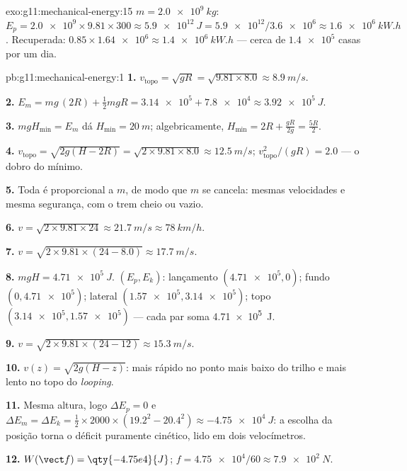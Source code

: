 \begin{solution}{exo:g11:mechanical-energy:15}
$m = \qty{2.0e9}{kg}$:
$E_p = \num{2.0e9} \times 9.81 \times 300 \approx \qty{5.9e12}{J}
= \num{5.9e12}/\num{3.6e6} \approx \qty{1.6e6}{kW.h}$. Recuperada:
$0.85 \times \num{1.64e6} \approx \qty{1.4e6}{kW.h}$ --- cerca de
$\num{1.4e5}$ casas por um dia.
\end{solution}

\begin{solution}{pb:g11:mechanical-energy:1}
\textbf{1.} $v_{\text{topo}} = \sqrt{gR} = \sqrt{9.81 \times 8.0}
\approx \qty{8.9}{m/s}$.

\textbf{2.} $E_m = mg\,(2R) + \tfrac12 m gR = \num{3.14e5} +
\num{7.8e4} \approx \qty{3.92e5}{J}$.

\textbf{3.} $mgH_{\min} = E_m$ dá $H_{\min} = \qty{20}{m}$;
algebricamente, $H_{\min} = 2R + \frac{gR}{2g} = \frac{5R}{2}$.

\textbf{4.} $v_{\text{topo}} = \sqrt{2g(H - 2R)} =
\sqrt{2 \times 9.81 \times 8.0} \approx \qty{12.5}{m/s}$;
$v_{\text{topo}}^2/(gR) = 2.0$ --- o dobro do mínimo.

\textbf{5.} Toda  é proporcional a $m$, de modo que $m$ se
cancela: mesmas velocidades e mesma segurança, com o trem cheio ou
vazio.

\textbf{6.} $v = \sqrt{2 \times 9.81 \times 24} \approx \qty{21.7}{m/s}
\approx \qty{78}{km/h}$.

\textbf{7.} $v = \sqrt{2 \times 9.81 \times (24 - 8.0)} \approx
\qty{17.7}{m/s}$.

\textbf{8.} $mgH = \qty{4.71e5}{J}$. $(E_p, E_k)$: lançamento
$(\num{4.71e5}, 0)$; fundo $(0, \num{4.71e5})$; lateral
$(\num{1.57e5}, \num{3.14e5})$; topo $(\num{3.14e5}, \num{1.57e5})$ ---
cada par soma \qty{4.71e5}{J}.

\textbf{9.} $v = \sqrt{2 \times 9.81 \times (24 - 12)} \approx
\qty{15.3}{m/s}$.

\textbf{10.} $v(z) = \sqrt{2g(H - z)}$: mais rápido no ponto mais baixo
do trilho e mais lento no topo do \emph{looping}.

\textbf{11.} Mesma altura, logo $\Delta E_p = 0$ e
$\Delta E_m = \Delta E_k = \tfrac12 \times 2000 \times (19.2^2 -
20.4^2) \approx \qty{-4.75e4}{J}$: a escolha da posição torna o déficit
puramente cinético, lido em dois velocímetros.

\textbf{12.} $W(\vect f) = \qty{-4.75e4}{J}$;
$f = \num{4.75e4}/60 \approx \qty{7.9e2}{N}$.


\end{solution}
